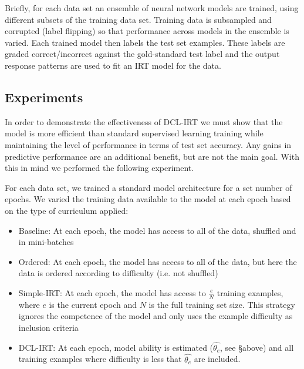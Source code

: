 \documentclass[letterpaper]{article} %
\begin{document}
Briefly, for each data set an ensemble of neural network models are trained, using different subsets of the training data set.
Training data is subsampled and corrupted (label flipping) so that performance across models in the ensemble is varied.
Each trained model then labels the test set examples.
These labels are graded correct/incorrect against the gold-standard test label and the output response patterns are used to fit an IRT model for the data.


\subsection{Experiments} 

In order to demonstrate the effectiveness of DCL-IRT we must show that the model is more efficient than standard supervised learning training while maintaining the level of performance in terms of test set accuracy. 
Any gains in predictive performance are an additional benefit, but are not the main goal.
With this in mind we performed the following experiment.

For each data set, we trained a standard model architecture for a set number of epochs. 
We varied the training data available to the model at each epoch based on the type of curriculum applied:

\begin{itemize}
	\item 
	Baseline: At each epoch, the model has access to all of the data, shuffled and in mini-batches
	\item 
	Ordered: At each epoch, the model has access to all of the data, but here the data is ordered according to difficulty (i.e. not shuffled) 
	\item 
	Simple-IRT: At each epoch, the model has access to $\frac{e}{N}$ training examples, where $e$ is the current epoch and $N$ is the full training set size. 
	This strategy ignores the competence of the model and only uses the example difficulty as inclusion criteria
	\item 
	DCL-IRT: At each epoch, model ability is estimated ($\hat{\theta_e}$, see \S above) and all training examples where difficulty is less that $\hat{\theta_e}$ are included.
\end{itemize}
\end{document}
